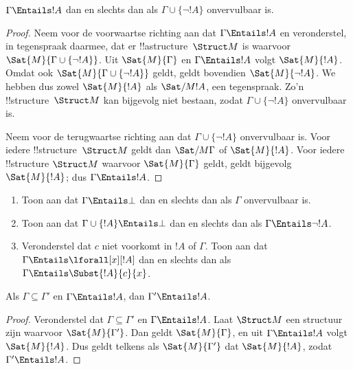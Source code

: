 \documentclass[openany]{memoir}
\begin{document}
\begin{prop}
$\Gamma \Entails !A$ dan en slechts dan als
$\Gamma \cup \{\lnot !A\}$ onvervulbaar is.
\end{prop}

\begin{proof}
Neem voor de voorwaartse richting aan dat $\Gamma \Entails !A$ en
veronderstel, in tegenspraak daarmee, dat er !!a{structure}~$\Struct M$
is waarvoor $\Sat{M}{\Gamma \cup \{ \lnot !A \}}$. Uit
$\Sat{M}{\Gamma}$ en $\Gamma \Entails !A$ volgt $\Sat{M}{!A}$. Omdat
ook $\Sat{M}{\Gamma\cup \{ \lnot !A \}}$ geldt, geldt bovendien
$\Sat{M}{\lnot !A}$. We hebben dus zowel $\Sat{M}{!A}$ als
$\Sat/{M}{!A}$, een tegenspraak. Zo'n !!{structure}~$\Struct M$ kan
bijgevolg niet bestaan, zodat $\Gamma \cup \{ \lnot !A \}$
onvervulbaar is.

Neem voor de terugwaartse richting aan dat
$\Gamma \cup \{ \lnot !A \}$ onvervulbaar is. Voor iedere
!!{structure}~$\Struct M$ geldt dan $\Sat/{M}{\Gamma}$ of
$\Sat{M}{!A}$. Voor iedere !!{structure} $\Struct M$ waarvoor
$\Sat{M}{\Gamma}$ geldt, geldt bijgevolg $\Sat{M}{!A}$; dus
$\Gamma \Entails !A$.
\end{proof}

\begin{prob}
\begin{enumerate}
\item Toon aan dat $\Gamma \Entails \bot$ dan en slechts dan als
  $\Gamma$ onvervulbaar is.
\item Toon aan dat $\Gamma \cup \{!A\} \Entails \bot$ dan en slechts
  dan als $\Gamma \Entails \lnot !A$.
\item Veronderstel dat $c$ niet voorkomt in $!A$ of $\Gamma$. Toon aan
  dat $\Gamma \Entails \lforall[x][!A]$ dan en slechts dan als
  $\Gamma \Entails
  \Subst{!A}{c}{x}$.
\end{enumerate}
\end{prob}

\begin{prop}
Als $\Gamma \subseteq \Gamma'$ en $\Gamma \Entails !A$, dan
$\Gamma' \Entails !A$.
\end{prop}

\begin{proof}
Veronderstel dat $\Gamma \subseteq \Gamma'$ en $\Gamma \Entails !A$.
Laat $\Struct M$ een structuur zijn waarvoor $\Sat{M}{\Gamma'}$.
Dan geldt $\Sat{M}{\Gamma}$, en uit $\Gamma \Entails !A$ volgt
$\Sat{M}{!A}$. Dus geldt telkens als $\Sat{M}{\Gamma'}$ dat
$\Sat{M}{!A}$, zodat $\Gamma' \Entails !A$.
\end{proof}
\end{document}
